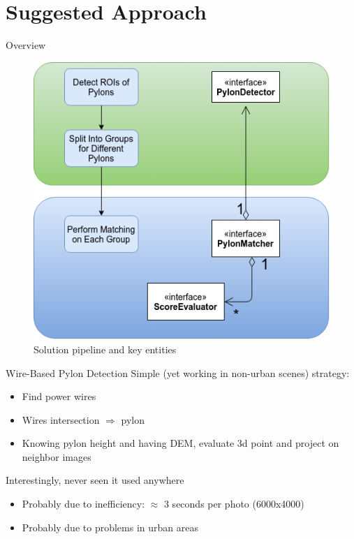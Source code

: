 \documentclass{beamer}
\begin{document}
\section{Suggested Approach}

\begin{frame}[t, fragile]{Overview}
\begin{figure}
\centering
\includegraphics[scale=0.37]{Pipeline}
\captionsetup{labelformat=empty}
\caption[a]{Solution pipeline and key entities}
\end{figure}
\end{frame}

\begin{frame}[t, fragile]{Wire-Based Pylon Detection}
Simple (yet working in non-urban scenes) strategy:
\begin{itemize}
\item Find power wires
\item Wires intersection $\Rightarrow$ pylon
\item Knowing pylon height and having DEM, evaluate 3d point and project on neighbor images
\end{itemize}
Interestingly, never seen it used anywhere
\begin{itemize}
\item Probably due to inefficiency: $\approx$ 3 seconds per photo (6000x4000)
\item Probably due to problems in urban areas
\end{itemize}
\end{frame}
\end{document}
